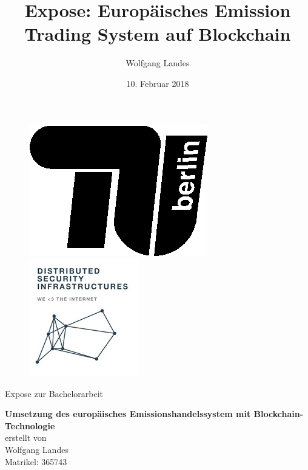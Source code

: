 \documentclass[a4paper, 10pt]{scrartcl}
\title{Expose: Europäisches Emission Trading System auf Blockchain}
\author{Wolfgang Landes}
\date{10. Februar 2018}
\begin{document}
\begin{titlepage} 
\begin{centering}

	\begin{figure}[!h]
  	\begin{minipage}{0.4\linewidth}
			\begin{center}
				\includegraphics[scale=1]{tu-logo.eps} 
  		\end{center}  
  	\end{minipage}
		\hfill
  	\begin{minipage}{0.45\linewidth} 
  		\begin{center}
				\includegraphics[scale=0.7]{DistributedSecInfra.jpg} 
  		\end{center}    
  	\end{minipage}
	\end{figure}
	
	\vspace{15mm}
	
	\LARGE

	Expose zur Bachelorarbeit
	
	\textbf{Umsetzung des europäisches Emissionshandelssystem mit Blockchain-Technologie}\\[2cm]

	
	\large
	erstellt von\\
	
	Wolfgang Landes\\
	Matrikel: 365743\\[2cm]


\end{centering}
\end{titlepage}
\end{document}
